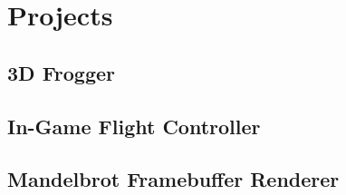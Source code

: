 \documentclass{amsart}
\theoremstyle{definition} %
\begin{document}
\section{Projects}

\subsection{3D Frogger}

\subsection{In-Game Flight Controller}

\subsection{Mandelbrot Framebuffer Renderer}


\appendix

\begin{thebibliography}{99}


\end{thebibliography}
\end{document}
